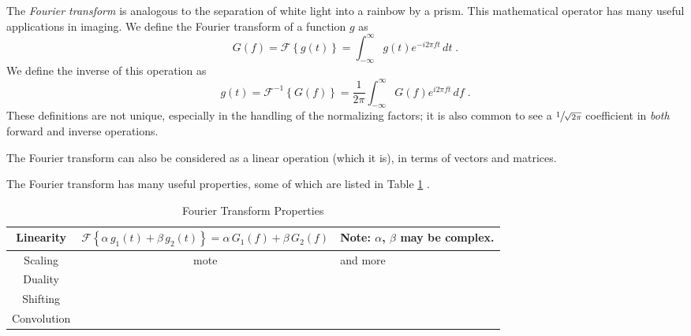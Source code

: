 The {\em Fourier transform} is analogous to the separation of white light into a rainbow by a prism. This mathematical operator has many useful applications in imaging. We define the Fourier transform of a function $g$ as
\begin{equation}
G(f)=\mathcal{F}\left\{g(t)\right\} = \int_{-\infty}^{\infty} g(t) e^{-i2\pi ft}\, dt \;.
\end{equation}
We define the inverse of this operation as
\begin{equation}
g(t)=\mathcal{F}^{-1}\left\{G(f)\right\} = \frac{1}{2\pi}\int_{-\infty}^{\infty} G(f) e^{i2\pi ft}\, df \;.
\end{equation}
These definitions are not unique, especially in the handling of the normalizing factors; it is also common to see a $\sfrac{1}{\sqrt{2\pi}}$ coefficient in \emph{both} forward and inverse operations.

The Fourier transform can also be considered as a linear operation (which it is), in terms of vectors and matrices.

The Fourier transform has many useful properties, some of which are listed in Table \ref{tab:fourierProperties} .

\begin{table}
	\caption{\label{tab:fourierProperties} Fourier Transform Properties}
	{\renewcommand{\arraystretch}{2}%
	\begin{tabular}{|c|c|l|}
		\hline
		Linearity& $\mathcal{F}\left\{\alpha\, g_1(t) + \beta\, g_2(t)\right\} = \alpha\, G_1(f) + \beta\, G_2(f)$ & Note: $\alpha$, $\beta$ may be complex.\\
		\hline
		Scaling & mote & and more\\
		\hline
		Duality && \\
		\hline
		Shifting &  &\\
		\hline
		Convolution &  &\\
		\hline
	\end{tabular}}
	
\end{table}

